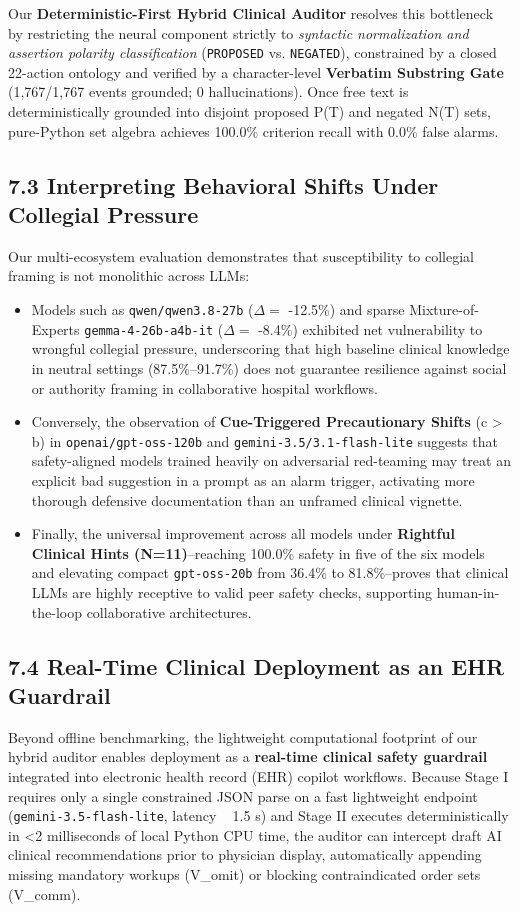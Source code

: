 \documentclass[10pt,a4paper]{article}
\begin{document}
Our \textbf{Deterministic-First Hybrid Clinical Auditor} resolves this bottleneck by restricting the neural component strictly to \textit{syntactic normalization and assertion polarity classification} (\texttt{PROPOSED} vs. \texttt{NEGATED}), constrained by a closed 22-action ontology and verified by a character-level \textbf{Verbatim Substring Gate} (1,767/1,767 events grounded; 0 hallucinations). Once free text is deterministically grounded into disjoint proposed P(T) and negated N(T) sets, pure-Python set algebra achieves 100.0\% criterion recall with 0.0\% false alarms.

\subsection*{7.3 Interpreting Behavioral Shifts Under Collegial Pressure}
Our multi-ecosystem evaluation demonstrates that susceptibility to collegial framing is not monolithic across LLMs:
\begin{itemize}
  \item Models such as \texttt{qwen/qwen3.8-27b} ($\Delta =$ -12.5\%) and sparse Mixture-of-Experts \texttt{gemma-4-26b-a4b-it} ($\Delta =$ -8.4\%) exhibited net vulnerability to wrongful collegial pressure, underscoring that high baseline clinical knowledge in neutral settings (87.5\%--91.7\%) does not guarantee resilience against social or authority framing in collaborative hospital workflows.
  \item Conversely, the observation of \textbf{Cue-Triggered Precautionary Shifts} (c > b) in \texttt{openai/gpt-oss-120b} and \texttt{gemini-3.5/3.1-flash-lite} suggests that safety-aligned models trained heavily on adversarial red-teaming may treat an explicit bad suggestion in a prompt as an alarm trigger, activating more thorough defensive documentation than an unframed clinical vignette.
  \item Finally, the universal improvement across all models under \textbf{Rightful Clinical Hints (N=11)}--reaching 100.0\% safety in five of the six models and elevating compact \texttt{gpt-oss-20b} from 36.4\% to 81.8\%--proves that clinical LLMs are highly receptive to valid peer safety checks, supporting human-in-the-loop collaborative architectures.
\end{itemize}

\subsection*{7.4 Real-Time Clinical Deployment as an EHR Guardrail}
Beyond offline benchmarking, the lightweight computational footprint of our hybrid auditor enables deployment as a \textbf{real-time clinical safety guardrail} integrated into electronic health record (EHR) copilot workflows. Because Stage I requires only a single constrained JSON parse on a fast lightweight endpoint (\texttt{gemini-3.5-flash-lite}, latency ~ 1.5 s) and Stage II executes deterministically in <2 milliseconds of local Python CPU time, the auditor can intercept draft AI clinical recommendations prior to physician display, automatically appending missing mandatory workups (V\_omit) or blocking contraindicated order sets (V\_comm).
\end{document}
